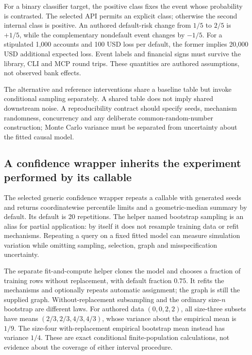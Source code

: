 For a binary classifier target, the positive class fixes the event whose
probability is contrasted. The selected API permits an explicit class;
otherwise the second internal class is positive. An authored default-risk
change from $1/5$ to $2/5$ is $+1/5$, while the complementary nondefault
event changes by $-1/5$. For a stipulated 1,000 accounts and 100 USD loss
per default, the former implies 20,000 USD additional expected loss.
Event labels and financial signs must survive the library, CLI and MCP
round trips. These quantities are authored assumptions, not observed
bank effects.\citep{exec24_gcm_source,exec24_gcm_choice}

The alternative and reference interventions share a baseline table but
invoke conditional sampling separately. A shared table does not imply
shared downstream noise. A reproducibility contract should specify seeds,
mechanism randomness, concurrency and any deliberate common-random-number
construction; Monte Carlo variance must be separated from uncertainty
about the fitted causal model.\citep{exec24_gcm_source,exec24_gcm_choice}

\subsection{A confidence wrapper inherits the experiment performed by its callable}
The selected generic confidence wrapper repeats a callable with generated
seeds and returns coordinatewise percentile limits and a geometric-median
summary by default. Its default is 20 repetitions. The helper named
bootstrap sampling is an alias for partial application: by itself it
does not resample training data or refit mechanisms. Repeating a query
on a fixed fitted model can measure simulation variation while omitting
sampling, selection, graph and misspecification uncertainty.
\citep{exec24_gcm_source}

The separate fit-and-compute helper clones the model and chooses a
fraction of training rows without replacement, with default fraction
$0.75$. It refits the mechanisms and optionally repeats automatic
assignment; the graph is still the supplied graph. Without-replacement
subsampling and the ordinary size-$n$ bootstrap are different laws.
For authored data $(0,0,2,2)$, all size-three subsets have means
$(2/3,2/3,4/3,4/3)$, whose variance about the empirical mean is $1/9$.
The size-four with-replacement empirical bootstrap mean instead has
variance $1/4$. These are exact conditional finite-population calculations,
not evidence about the coverage of either interval procedure.
\citep{exec24_gcm_source,exec24_gcm_choice}


